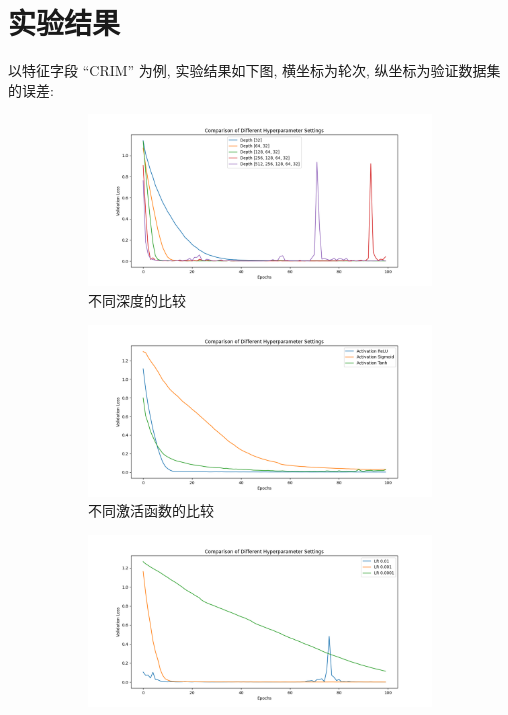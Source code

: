 \documentclass{article}
\begin{document}
	\section{实验结果}
		以特征字段 ``CRIM'' 为例, 实验结果如下图, 横坐标为轮次, 纵坐标为验证数据集的误差:

		\begin{figure}[htbp]
			\centering
			\begin{subfigure}[b]{0.45\textwidth}
				\includegraphics[width=\textwidth]{figure/depths.png}
				\caption{不同深度的比较}
			\end{subfigure}
			\begin{subfigure}[b]{0.45\textwidth}
				\includegraphics[width=\textwidth]{figure/activation_functions.png}
				\caption{不同激活函数的比较}
			\end{subfigure}
			\begin{subfigure}[b]{0.45\textwidth}
				\includegraphics[width=\textwidth]{figure/learning_rates.png}

\end{subfigure}
\end{figure}
\end{document}
